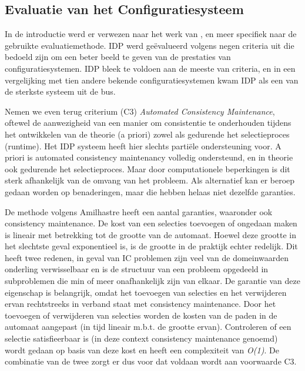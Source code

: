 \subsection{Evaluatie van het Configuratiesysteem}
In de introductie werd er verwezen naar het werk van \citep{van2016kb}, en meer specifiek naar de gebruikte evaluatiemethode. IDP werd ge\"{e}valueerd volgens negen criteria uit \citep{felfernig2014knowledge} die bedoeld zijn om een beter beeld te geven van de prestaties van configuratiesystemen. IDP bleek te voldoen aan de meeste van criteria, en in een vergelijking met tien andere bekende configuratiesystemen kwam IDP als een van de sterkste systeem uit de bus. 

Nemen we even terug criterium (C3) \textit{Automated Consistency Maintenance}, oftewel de aanwezigheid van een manier om consistentie te onderhouden tijdens het ontwikkelen van de theorie (a priori) zowel als gedurende het selectieproces (runtime). Het IDP systeem heeft hier slechts parti\"{e}le ondersteuning voor. A priori is automated consistency maintenancy volledig ondersteund, en in theorie ook gedurende het selectieproces. Maar door computationele beperkingen is dit sterk afhankelijk van de omvang van het probleem. Als alternatief kan er beroep gedaan worden op benaderingen, maar die hebben helaas niet dezelfde garanties. 

De methode volgens Amilhastre heeft een aantal garanties, waaronder ook consistency maintenance. De kost van een selecties toevoegen of ongedaan maken is lineair met betrekking tot de grootte van de automaat. Hoewel deze grootte in het slechtste geval exponentieel is, is de grootte in de praktijk echter redelijk. Dit heeft twee redenen, in geval van IC problemen zijn veel van de domeinwaarden onderling verwisselbaar en is de structuur van een probleem opgedeeld in subproblemen die min of meer onafhankelijk zijn van elkaar. De garantie van deze eigenschap is belangrijk, omdat het toevoegen van selecties en het verwijderen ervan rechtstreeks in verband staat met consistency maintenance. Door het toevoegen of verwijderen van selecties worden de kosten van de paden in de automaat aangepast (in tijd lineair m.b.t. de grootte ervan). Controleren of een selectie satisfieerbaar is (in deze context consistency maintenance genoemd) wordt gedaan op basis van deze kost en heeft een complexiteit van \textit{O(1)}. De combinatie van de twee zorgt er dus voor dat voldaan wordt aan voorwaarde C3. 

